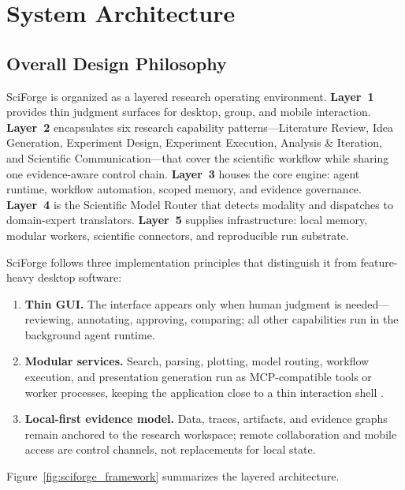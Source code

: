 \documentclass[sn-basic,Numbered,pdflatex]{sn-jnl}
\begin{document}
\section{System Architecture}\label{sec:system-architecture}

\subsection{Overall Design Philosophy}

SciForge is organized as a layered research operating environment. \textbf{Layer~1} provides thin judgment surfaces for desktop, group, and mobile interaction. \textbf{Layer~2} encapsulates six research capability patterns---Literature Review, Idea Generation, Experiment Design, Experiment Execution, Analysis \& Iteration, and Scientific Communication---that cover the scientific workflow while sharing one evidence-aware control chain. \textbf{Layer~3} houses the core engine: agent runtime, workflow automation, scoped memory, and evidence governance. \textbf{Layer~4} is the Scientific Model Router that detects modality and dispatches to domain-expert translators. \textbf{Layer~5} supplies infrastructure: local memory, modular workers, scientific connectors, and reproducible run substrate.

SciForge follows three implementation principles that distinguish it from feature-heavy desktop software:

\begin{enumerate}
    \item \textbf{Thin GUI.} The interface appears only when human judgment is needed---reviewing, annotating, approving, comparing; all other capabilities run in the background agent runtime.
    \item \textbf{Modular services.} Search, parsing, plotting, model routing, workflow execution, and presentation generation run as MCP-compatible tools or worker processes, keeping the application close to a thin interaction shell \cite{anthropicMCP2024}.
    \item \textbf{Local-first evidence model.} Data, traces, artifacts, and evidence graphs remain anchored to the research workspace; remote collaboration and mobile access are control channels, not replacements for local state.
\end{enumerate}

Figure~\ref{fig:sciforge_framework} summarizes the layered architecture.
\end{document}
